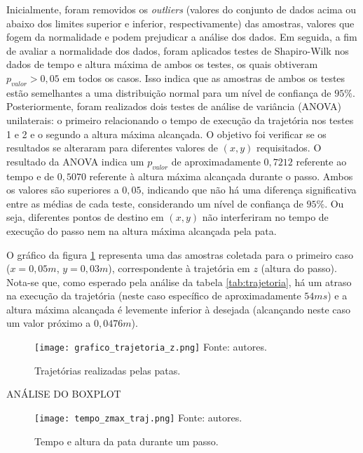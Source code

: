 \documentclass[../main.tex]{subfiles}
\begin{document}
  Inicialmente, foram removidos os \textit{outliers} (valores do conjunto de dados acima ou abaixo dos limites superior e inferior, respectivamente) das amostras, valores que fogem da normalidade e podem prejudicar a análise dos dados. Em seguida, a fim de avaliar a normalidade dos dados, foram aplicados testes de Shapiro-Wilk nos dados de tempo e altura máxima de ambos os testes, os quais obtiveram $p_{valor} > 0,05$ em todos os casos. Isso indica que as amostras de ambos os testes estão semelhantes a uma distribuição normal para um nível de confiança de $95\%$. Posteriormente, foram realizados dois testes de análise de variância (ANOVA) unilaterais: o primeiro relacionando o tempo de execução da trajetória nos testes 1 e 2 e o segundo a altura máxima alcançada. O objetivo foi verificar se os resultados se alteraram para diferentes valores de $(x, y)$ requisitados. O resultado da ANOVA indica um $p_{valor}$ de aproximadamente $0,7212$ referente ao tempo e de $0,5070$ referente à altura máxima alcançada durante o passo. Ambos os valores são superiores a $0,05$, indicando que não há uma diferença significativa entre as médias de cada teste, considerando um nível de confiança de $95\%$. Ou seja, diferentes pontos de destino em $(x, y)$ não interferiram no tempo de execução do passo nem na altura máxima alcançada pela pata.

  O gráfico da figura \ref{fig:grafico_trajetoria_xyz} representa uma das amostras coletada para o primeiro caso ($x=0,05m$, $y=0,03m$), correspondente à trajetória em $z$ (altura do passo). Nota-se que, como esperado pela análise da tabela \ref{tab:trajetoria}, há um atraso na execução da trajetória (neste caso específico de aproximadamente $54ms$) e a altura máxima alcançada é levemente inferior à desejada (alcançando neste caso um valor próximo a $0,0476m$).

  \begin{figure}[!htb]
    \centering
    \caption{Trajetórias realizadas pelas patas.}
    \texttt{[image: grafico\_trajetoria\_z.png]}
    Fonte: autores.
    \label{fig:grafico_trajetoria_xyz}
  \end{figure}

  ANÁLISE DO BOXPLOT 

  \begin{figure}[!htb]
    \centering
    \caption{Tempo e altura da pata durante um passo.}
    \texttt{[image: tempo\_zmax\_traj.png]}
    Fonte: autores.
    \label{fig:time_zmax_traj}
  \end{figure}
\end{document}
